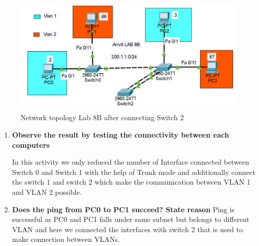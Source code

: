 \documentclass[a4paper,11pt]{article}
\begin{document}
\begin{enumerate}
          \begin{figure}[H]
              \centering
              \includegraphics[scale=0.65,cframe=blue 0.5pt 3pt]{./FIG/Lab8B7.jpg}
              \caption{Network topology Lab 8B after connecting Switch 2 }
          \end{figure}


          \begin{enumerate}
              \item\textbf{Observe the result by testing the connectivity between each computers}








                    In this activity we only reduced the number of Interface connected between Switch 0 and Switch 1 with the help of Trunk mode and additionally connect the switch 1 and switch 2 which make the communication between VLAN 1 and VLAN 2 possible.

              \item\textbf{  Does the ping from PC0 to PC1 succeed? State reason}
                    Ping is successful as PC0 and PC1 falls under same subnet but belongs to different VLAN and here we connected the interfaces with switch 2 that is used to make connection between VLANs.



\end{enumerate}
\end{enumerate}
\end{document}
